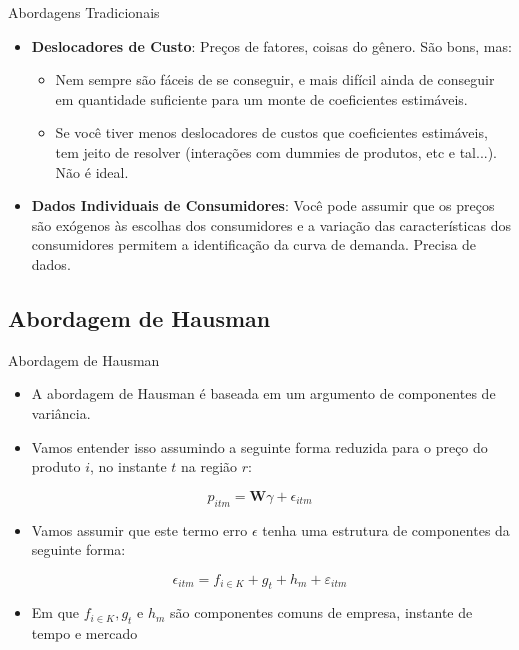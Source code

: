 \documentclass{beamer}
\begin{document}
\begin{frame}{Abordagens Tradicionais}
\begin{itemize}
    \item \textbf{Deslocadores de Custo}: Preços de fatores, coisas do gênero. São bons, mas:
    \begin{itemize}
        \item Nem sempre são fáceis de se conseguir, e mais difícil ainda de conseguir em quantidade suficiente para um monte de coeficientes estimáveis.
        \item Se você tiver menos deslocadores de custos que coeficientes estimáveis, tem jeito de resolver (interações com dummies de produtos, etc e tal...). Não é ideal.
    \end{itemize}
    \item \textbf{Dados Individuais de Consumidores}: Você pode assumir que os preços são exógenos às escolhas dos consumidores e a variação das características dos consumidores permitem a identificação da curva de demanda. Precisa de dados.
\end{itemize}
    
\end{frame}

\subsection{Abordagem de Hausman}

\begin{frame}{Abordagem de Hausman}
\begin{itemize}
    \item A abordagem de Hausman é baseada em um argumento de componentes de variância.
    \item Vamos entender isso assumindo a seguinte forma reduzida para o preço do produto $i$, no instante $t$ na região $r$:
\end{itemize}
\[
p_{itm}=\mathbf{W}\gamma+\epsilon_{itm}
\]
\begin{itemize}
    \item Vamos assumir que este termo erro $\epsilon$ tenha uma estrutura de componentes da seguinte forma:
\end{itemize}

\[
\epsilon_{itm}=f_{i\in K}+g_{t}+h_{m}+\varepsilon_{itm}
\]

\begin{itemize}
    \item Em que $f_{i\in K},g_{t}$ e $h_{m}$ são componentes comuns de empresa, instante de tempo e mercado
\end{itemize}
\end{frame}
\end{document}
